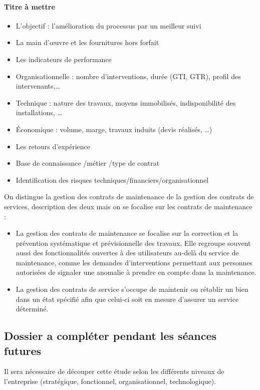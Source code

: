 \paragraph{Titre à mettre}

\begin{itemize}
\item L’objectif : l’amélioration du processus par un meilleur suivi
\item La main d’œuvre et les fournitures hors forfait
\item Les indicateurs de performance 
\item Organisationnelle : nombre d’interventions, durée (GTI, GTR), profil des intervenants,…
\item Technique : nature des travaux, moyens immobilisés, indisponibilité des installations,  …
\item Économique : volume, marge, travaux induits (devis réalisés, …)
\item Les retours d’expérience
\item Base de connaissance /métier /type de contrat
\item Identification des risques techniques/financiers/organisationnel
\end{itemize}

On distingue la gestion des contrats de maintenance de la gestion des contrats de services, description des deux mais on se focalise sur les contrats de maintenance :

\begin{itemize}
\item La gestion des contrats de maintenance se focalise sur la correction et la prévention systématique et prévisionnelle des travaux. Elle regroupe souvent aussi des fonctionnalités ouvertes à des utilisateurs au-delà du service de maintenance, comme les demandes d’interventions permettant aux personnes autorisées de signaler une anomalie à prendre en compte dans la maintenance.
\item La gestion des contrats de service s’occupe de maintenir ou rétablir un bien dans un état spécifié afin que celui-ci soit en mesure d’assurer un service déterminé.
\end{itemize}

\subsection{Dossier a compléter pendant les séances futures}

Il sera nécessaire de découper cette étude selon les différents niveaux de l’entreprise (stratégique, fonctionnel, organisationnel, technologique).

